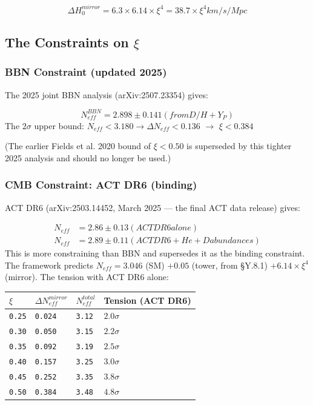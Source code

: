 \documentclass[aps,prd,preprint,superscriptaddress,longbibliography,floatfix]{revtex4-2}
\theoremstyle{remark}
\begin{document}
\begin{equation}
    \Delta H_{0}^{mirror} = 6.3 \times 6.14 \times \xi^{4} = 38.7 \times \xi^{4}  km/s/Mpc
\end{equation}


\subsection{The Constraints on $\xi$}


\subsubsection{BBN Constraint (updated 2025)}

The 2025 joint BBN analysis (arXiv:2507.23354) gives:


\begin{equation}
    N_{eff}^{BBN} = 2.898 \pm 0.141  (from D/H + Y_P)
\end{equation}
The $2\sigma$ upper bound: $N_{eff} < 3.180 \to \Delta N_{eff} < 0.136$ $\to$ \textbf{$\xi < 0.384$}

(The earlier Fields et al. 2020 bound of $\xi < 0.50$ is superseded by this tighter 2025 analysis and should no longer be used.)


\subsubsection{CMB Constraint: ACT DR6 (binding)}

ACT DR6 (arXiv:2503.14452, March 2025 --- the final ACT data release) gives:


\begin{align}
    N_{eff} &= 2.86 \pm 0.13  (ACT DR6 alone) \\
    N_{eff} &= 2.89 \pm 0.11  (ACT DR6 + He + D abundances)
\end{align}
This is more constraining than BBN and supersedes it as the binding constraint. The framework predicts $N_{eff} = 3.046$ (SM) $+ 0.05$ (tower, from \S{}Y.8.1) $+ 6.14 \times \xi^{4}$ (mirror). The tension with ACT DR6 alone:


\begin{table}[H]
\begin{ruledtabular}
\begin{tabular}{p{3.8cm}p{3.8cm}p{3.8cm}p{3.8cm}}
$\xi$ & $\Delta N_{eff}^{mirror}$ & $N_{eff}^{total}$ & Tension (ACT DR6) \\
\hline
\texttt{0.25} & \texttt{0.024} & \texttt{3.12} & $2.0\sigma$ \\
\texttt{0.30} & \texttt{0.050} & \texttt{3.15} & $2.2\sigma$ \\
\texttt{0.35} & \texttt{0.092} & \texttt{3.19} & $2.5\sigma$ \\
\texttt{0.40} & \texttt{0.157} & \texttt{3.25} & $3.0\sigma$ \\
\texttt{0.45} & \texttt{0.252} & \texttt{3.35} & $3.8\sigma$ \\
\texttt{0.50} & \texttt{0.384} & \texttt{3.48} & $4.8\sigma$ \\
\end{tabular}
\end{ruledtabular}
\end{table}
\end{document}
